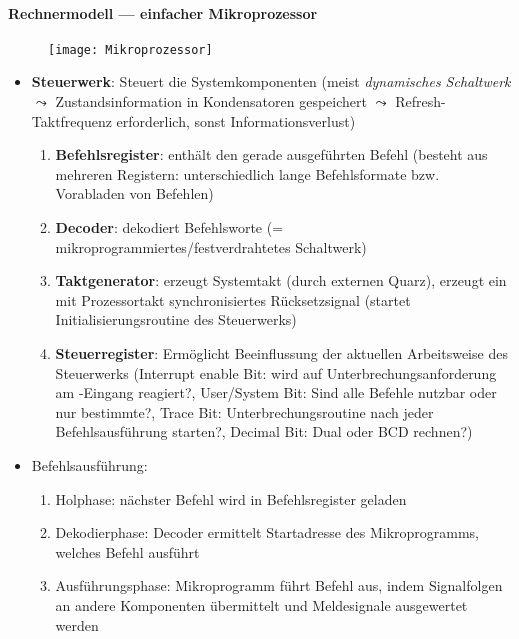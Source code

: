 \paragraph{Rechnermodell --- einfacher Mikroprozessor}
\begin{figure}[ht]
  \centering
  \texttt{[image: Mikroprozessor]}
  \label{Mikroprozessor}
\end{figure}
\begin{itemize}
	\item \textbf{\textcolor{red!90!black}{Steuerwerk}}: Steuert die Systemkomponenten (meist \emph{dynamisches Schaltwerk} $\leadsto$ Zustandsinformation in Kondensatoren gespeichert $\leadsto$ Refresh-Taktfrequenz erforderlich, sonst Informationsverlust)
	\begin{enumerate}
		\item \textbf{Befehlsregister}: enthält den gerade ausgeführten Befehl (besteht aus mehreren Registern: unterschiedlich lange Befehlsformate bzw. Vorabladen von Befehlen)
		\item \textbf{Decoder}: dekodiert Befehlsworte (= mikroprogrammiertes/festverdrahtetes Schaltwerk)
		\item \textbf{Taktgenerator}: erzeugt Systemtakt (durch externen Quarz), erzeugt ein mit Prozessortakt synchronisiertes Rücksetzsignal (startet Initialisierungsroutine des Steuerwerks)
		\item \textbf{Steuerregister}: Ermöglicht Beeinflussung der aktuellen Arbeitsweise des Steuerwerks (Interrupt enable Bit: wird auf Unterbrechungsanforderung am -Eingang reagiert?, User/System Bit: Sind alle Befehle nutzbar oder nur bestimmte?, Trace Bit: Unterbrechungsroutine nach jeder Befehlsausführung starten?, Decimal Bit: Dual oder BCD rechnen?)
	\end{enumerate}
	\item Befehlsausführung:
	\begin{enumerate}
		\item Holphase: nächster Befehl wird in Befehlsregister geladen
		\item Dekodierphase: Decoder ermittelt Startadresse des Mikroprogramms, welches Befehl ausführt
		\item Ausführungsphase: Mikroprogramm führt Befehl aus, indem Signalfolgen an andere Komponenten übermittelt und Meldesignale ausgewertet werden
	\end{enumerate}


\end{itemize}
